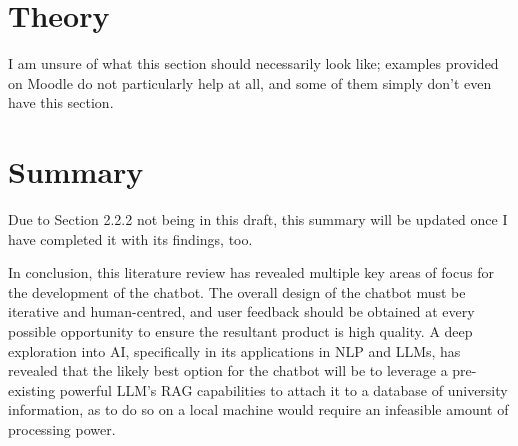 \documentclass[12pt]{report}
\begin{document}
    \section{Theory}


    \begin{tcolorbox}[colback=red!5!white,colframe=red!75!black,title=Missing section - To be done in future draft/final]
        I am unsure of what this section should necessarily look like; examples provided on Moodle 
        do not particularly help at all, and some of them simply don't even have this section.
    \end{tcolorbox}
    
    \section{Summary}


    \begin{tcolorbox}[colback=red!5!white,colframe=orange!75!black,title=To be changed]
        Due to Section 2.2.2 not being in this draft, this summary will be updated once I have completed
        it with its findings, too.
    \end{tcolorbox}
    
    In conclusion, this literature review has revealed multiple key areas of focus for the development of the 
    chatbot. The overall design of the chatbot must be iterative and human-centred, and user feedback should 
    be obtained at every possible opportunity to ensure the resultant product is high quality. A deep exploration 
    into AI, specifically in its applications in NLP and LLMs, has revealed that the likely best option for the chatbot 
    will be to leverage a pre-existing powerful LLM's RAG capabilities to attach it to a database of university information,
    as to do so on a local machine would require an infeasible amount of processing power.
\end{document}
